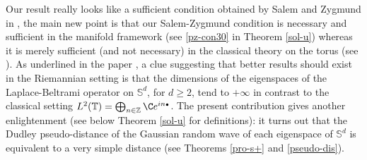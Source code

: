 \documentclass[10pt]{amsart}
\newcommand{\sbullet}{{\scriptscriptstyle\bullet}}
\theoremstyle{theorem}
\theoremstyle{definition}
\newcommand\Z{\mathbb{Z}}
\newcommand\bbS{\mathbb{S}}
\begin{document}
Our result really looks like a sufficient condition obtained by Salem and Zygmund in \cite[p.\,291]{salem1954}, the main new point is that our Salem-Zygmund condition is necessary and sufficient in the manifold framework (see \eqref{pz-con30} in Theorem \ref{sol-u}) whereas it is merely sufficient (and not necessary) in the classical theory on the torus (see \cite[p.\,292]{salem1954}). As underlined in the paper \cite{burq-lebeau}, a clue suggesting that better results should exist in the Riemannian setting is that the dimensions of the eigenspaces of the Laplace-Beltrami operator on $\bbS^d$, for $d\geq 2$, tend to $+\infty$ in contrast to the classical setting $L^2(\mathbb{T})=\bigoplus_{n\in \Z} \C e^{in\sbullet}$. The present contribution gives another enlightenment (see \hbox{below} Theorem \ref{sol-u} for definitions): it turns out that the Dudley pseudo-distance of the Gaussian random wave of each eigenspace of $\bbS^d$ is equivalent to a very simple distance (see Theorems \ref{pro-s+} and \ref{pseudo-dis}).
\end{document}
